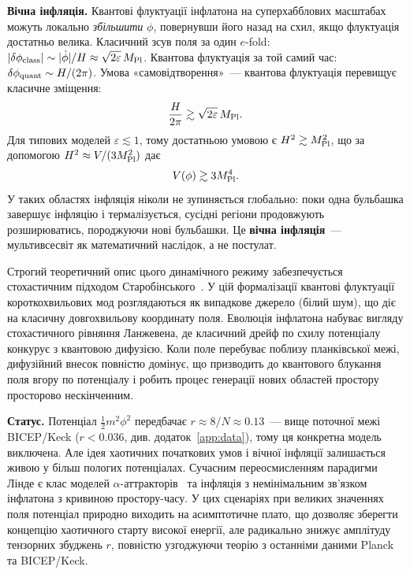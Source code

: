 \textbf{Вічна інфляція.} Квантові флуктуації інфлатона на
суперхабблових масштабах можуть локально \emph{збільшити} $\phi$,
повернувши його назад на схил, якщо флуктуація достатньо велика.
Класичний зсув поля за один $e$-fold: $|\delta\phi_{\rm class}|
\sim |\dot\phi|/H \approx \sqrt{2\varepsilon}\,M_{\rm Pl}$.
Квантова флуктуація за той самий час: $\delta\phi_{\rm quant}
\sim H/(2\pi)$. Умова «самовідтворення»~---
квантова флуктуація перевищує класичне зміщення:
\begin{equation*}
  \frac{H}{2\pi} \gtrsim \sqrt{2\varepsilon}\,M_{\rm Pl}.
\end{equation*}
Для типових моделей $\varepsilon \lesssim 1$, тому достатньою
умовою є $H^2 \gtrsim M_{\rm Pl}^2$, що за допомогою
$H^2 \approx V/(3M_{\rm Pl}^2)$ дає
\begin{equation*}
  V(\phi) \gtrsim 3M_{\rm Pl}^4.
\end{equation*}
У таких областях інфляція ніколи не зупиняється глобально:
поки одна бульбашка завершує інфляцію і термалізується,
сусідні регіони продовжують розширюватись, породжуючи нові
бульбашки. Це \textbf{вічна інфляція}~--- мультивсесвіт
як математичний наслідок, а не постулат.

Строгий теоретичний опис цього динамічного режиму забезпечується стохастичним
підходом Старобінського~\cite{starobinsky_1986}. У цій формалізації квантові флуктуації короткохвильових
мод розглядаються як випадкове джерело (білий шум), що діє на класичну
довгохвильову координату поля. Еволюція інфлатона набуває вигляду стохастичного
рівняння Ланжевена, де класичний дрейф по схилу потенціалу конкурує з квантовою
дифузією. Коли поле перебуває поблизу планківської межі, дифузійний внесок
повністю домінує, що призводить до квантового блукання поля вгору по потенціалу
і робить процес генерації нових областей простору просторово нескінченним.

\textbf{Статус.} Потенціал $\tfrac{1}{2}m^2\phi^2$ передбачає
$r \approx 8/N \approx 0.13$~--- вище поточної межі BICEP/Keck
($r < 0.036$, див. додаток~\ref{app:data}), тому ця конкретна модель виключена.
Але ідея хаотичних початкових умов і вічної інфляції
залишається живою у більш пологих потенціалах.
Сучасним переосмисленням парадигми Лінде є клас моделей
$\alpha$-аттракторів~\cite{ferrara_2013,kallosh_2013}
та інфляція з немінімальним зв'язком інфлатона з кривиною простору-часу.
У цих сценаріях при великих значеннях поля потенціал природно виходить на
асимптотичне плато, що дозволяє зберегти концепцію хаотичного старту високої
енергії, але радикально знижує амплітуду тензорних збуджень $r$, повністю
узгоджуючи теорію з останніми даними Planck та BICEP/Keck.


